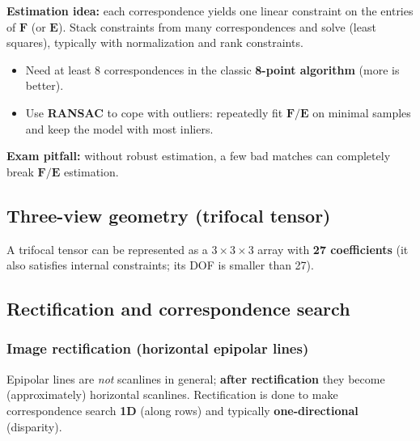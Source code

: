 \documentclass[11pt,a4paper]{article}
\newcommand{\mat}[1]{\mathbf{#1}}
\begin{document}
\begin{defbox}
\textbf{Estimation idea:} each correspondence yields one linear constraint on the entries of $\mat{F}$ (or $\mat{E}$).
Stack constraints from many correspondences and solve (least squares), typically with normalization and rank constraints.
\end{defbox}

\begin{itemize}
  \item Need at least 8 correspondences in the classic \textbf{8-point algorithm} (more is better).
  \item Use \textbf{RANSAC} to cope with outliers: repeatedly fit $\mat{F}/\mat{E}$ on minimal samples and keep the model with most inliers.
\end{itemize}

\begin{qbox}
\textbf{Exam pitfall:} without robust estimation, a few bad matches can completely break $\mat{F}/\mat{E}$ estimation.
\end{qbox}

\subsection{Three-view geometry (trifocal tensor)}
\begin{notebox}
A trifocal tensor can be represented as a $3\times3\times3$ array with \textbf{27 coefficients} (it also satisfies internal constraints; its DOF is smaller than 27).
\end{notebox}

\subsection{Rectification and correspondence search}

\subsubsection{Image rectification (horizontal epipolar lines)}
\begin{notebox}
Epipolar lines are \emph{not} scanlines in general; \textbf{after rectification} they become (approximately) horizontal scanlines.
Rectification is done to make correspondence search \textbf{1D} (along rows) and typically \textbf{one-directional} (disparity).
\end{notebox}
\end{document}
